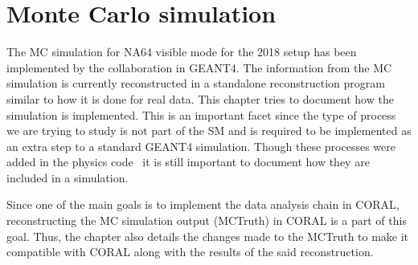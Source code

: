 
\chapter{Monte Carlo simulation}
\label{sec:MC}
The MC simulation for NA64 visible mode for the 2018 setup has been implemented by the collaboration in GEANT4. The information from the MC simulation is currently reconstructed in a standalone reconstruction program similar to how it is done for real data. This chapter tries to document how the simulation is implemented. This is an important facet since the type of process we are trying to study is not part of the SM and is required to be implemented as an extra step to a standard GEANT4 simulation. Though these processes were added in the physics code~\cite{Gninenko:2017yus,PhysRevD.97.072002} it is still important to document how they are included in a simulation.

Since one of the main goals is to implement the data analysis chain in CORAL, reconstructing the MC simulation output (MCTruth) in CORAL is a part of this goal. Thus, the chapter also details the changes made to the MCTruth to make it compatible with CORAL along with the results of the said reconstruction.

